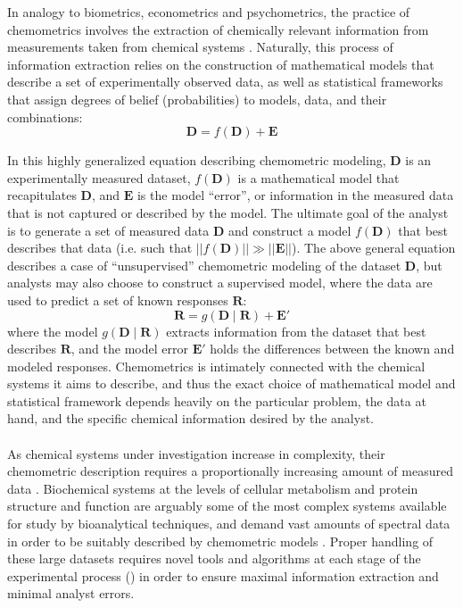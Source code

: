\begin{doublespace}
In analogy to biometrics, econometrics and psychometrics, the practice of
chemometrics involves the extraction of chemically relevant information from
measurements taken from chemical systems \cite{wold:cils1995}.
Naturally, this process of information extraction relies on the construction of
mathematical models that describe a set of experimentally observed data, as
well as statistical frameworks that assign degrees of belief (probabilities)
to models, data, and their combinations:
\begin{equation*}
\mathbf{D} = f(\mathbf{D}) + \mathbf{E}
\end{equation*}

In this highly generalized equation describing chemometric modeling,
$\mathbf{D}$ is an experimentally measured dataset, $f(\mathbf{D})$ is
a mathematical model that recapitulates $\mathbf{D}$, and $\mathbf{E}$ is
the model ``error'', or information in the measured data that is not
captured or described by the model. The ultimate goal of the analyst is to
generate a set of measured data $\mathbf{D}$ and construct a model
$f(\mathbf{D})$ that best describes that data (i.e. such that
$||f(\mathbf{D})|| \gg ||\mathbf{E}||$). The above general equation describes
a case of ``unsupervised'' chemometric modeling of the dataset $\mathbf{D}$,
but analysts may also choose to construct a supervised model, where the data
are used to predict a set of known responses $\mathbf{R}$:
\begin{equation*}
\mathbf{R} = g(\mathbf{D} \mid \mathbf{R}) + \mathbf{E}'
\end{equation*}
where the model $g(\mathbf{D} \mid \mathbf{R})$ extracts information from the
dataset that best describes $\mathbf{R}$, and the model error $\mathbf{E}'$
holds the differences between the known and modeled responses. Chemometrics
is intimately connected with the chemical systems it aims to describe, and
thus the exact choice of mathematical model and statistical framework depends
heavily on the particular problem, the data at hand, and the specific chemical
information desired by the analyst.
\\\\
As chemical systems under investigation increase in complexity, their
chemometric description requires a proportionally increasing amount of
measured data \cite{wold:cils1995}. Biochemical systems at the
levels of cellular metabolism and protein structure and function are
arguably some of the most complex systems available for study by
bioanalytical techniques, and demand vast amounts of spectral data
in order to be suitably described by chemometric models
\cite{
  wutrich:jmolb1982,
  kay:jmr2005,
  lindon:cmr2000,
  chen:rcms2006,
  han:metab2008,
  barding:jacs2012,
  baker:mmbio2012,
  marshall:metab2015}. Proper handling of these large datasets requires novel
tools and algorithms at each stage of the experimental process
() in order to ensure maximal information extraction
and minimal analyst errors.
\end{doublespace}

